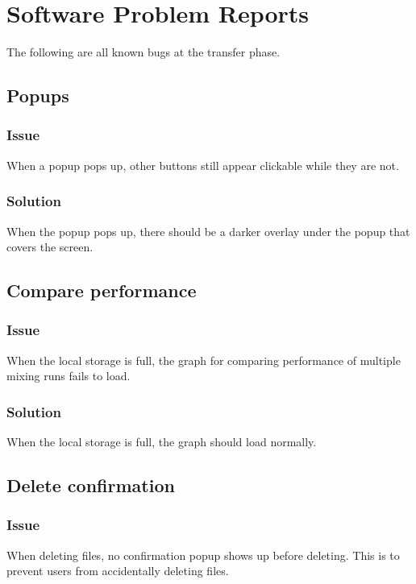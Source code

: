 \chapter{Software Problem Reports}
\label{chap:problems}

The following are all known bugs at the transfer phase.

\section{Popups}

\subsection*{Issue}
When a popup pops up, other buttons still appear clickable while they are not.

\subsection*{Solution}
When the popup pops up, there should be a darker overlay under the popup that covers the screen.

\section{Compare performance}

\subsection*{Issue}
When the local storage is full, the graph for comparing performance of multiple mixing runs fails to load.

\subsection*{Solution}
When the local storage is full, the graph should load normally.

\section{Delete confirmation}

\subsection*{Issue}
When deleting files, no confirmation popup shows up before deleting. This is to prevent users from accidentally deleting files.

